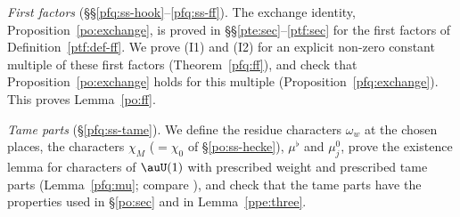 \documentclass[10pt]{amsart}
\theoremstyle{definition}
\theoremstyle{remark}
\begin{document}
\emph{First factors} (\S\S\ref{pfq:ss-hook}--\ref{pfq:ss-ff}). The exchange identity,
Proposition~\ref{po:exchange}, is proved in \S\S\ref{pte:sec}--\ref{ptf:sec} for the first factors of
Definition~\ref{ptf:def-ff}. We prove (I1) and (I2) for an
explicit non-zero constant multiple of these first factors
(Theorem~\ref{pfq:ff}), and check that Proposition~\ref{po:exchange} holds for this multiple
(Proposition~\ref{pfq:exchange}). This proves Lemma~\ref{po:ff}.

\emph{Tame parts} (\S\ref{pfq:ss-tame}). We define the residue characters $\omega_w$ at the chosen
places, the characters $\chi_M$ ($=\chi_0$ of \S\ref{po:ss-hecke}), $\mu^\flat$ and $\mu^0_j$, prove the
existence lemma for characters of $\auU(1)$ with prescribed weight and prescribed tame parts
(Lemma~\ref{pfq:mu}; compare {\cite[Lemma~8.6]{P49}}), and check that the tame parts have the
properties used in \S\ref{po:sec} and in Lemma~\ref{ppe:three}.
\end{document}
